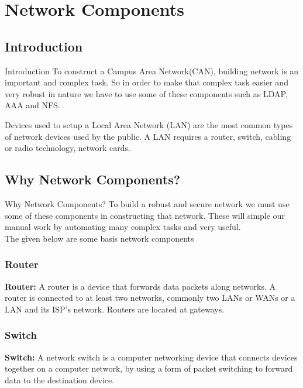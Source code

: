 \documentclass[10pt,xcolor=dvipsnames]{beamer}
\begin{document}
\section{Network Components}
\subsection{Introduction}
\begin{frame}{Introduction}
To construct a Campus Area Network(CAN), building network is an important and complex task. So in order to make that complex task easier and very robust in nature we have to use some of these components such as LDAP, AAA and NFS.
\newline

Devices used to setup a Local Area Network (LAN) are the most common types of network devices used by the public. A LAN requires a router, switch, cabling or radio technology, network cards.
\end{frame}

\subsection{Why Network Components?}
\begin{frame}{Why Network Components?}
To build a robust and secure network we must use some of these components in constructing that network. These will simple our manual work by automating many complex tasks and very useful.\linebreak \\
The given below are some basis network components\linebreak \\ 

\subsubsection{Router}
\textbf{Router: }
A router is a device that forwards data packets along networks. A router is connected to at least two networks, commonly two LANs or WANs or a LAN and its ISP's network. Routers are located at gateways.\linebreak \\
\subsubsection{Switch}
\textbf{Switch: }
A network switch is a computer networking device that connects devices together on a computer network, by using a form of packet switching to forward data to the destination device.
\end{frame}
\end{document}
